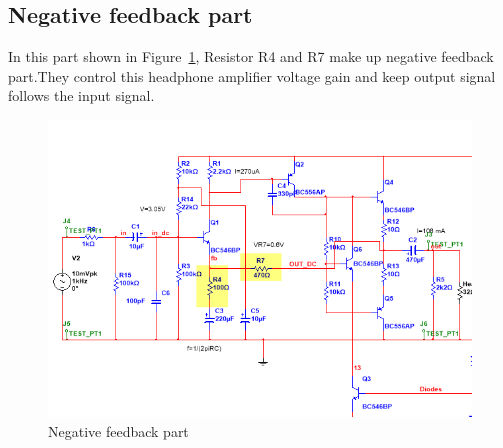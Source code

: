 \subsection{Negative feedback part} 
In this part shown in Figure~\ref{fig:Negative feedback part}, Resistor R4 and R7 make up negative feedback part.They control this headphone amplifier voltage gain and keep output signal follows the input signal.


\begin{figure}[htbp]
	\centering
	\includegraphics[scale=0.7]{"../Photo/Chap5/Negative feedback part"}
	\caption{Negative feedback part}
	\label{fig:Negative feedback part}
\end{figure}